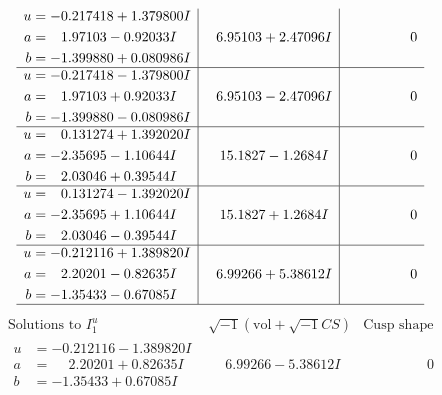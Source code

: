 \documentclass[1p]{elsarticle_modified}
\theoremstyle{definition}
\newcommand{\I}{\sqrt{-1}}
\begin{document}
$$\begin{array}{c|c|c}
\begin{aligned}
u &= -0.217418 + 1.379800 I \\
a &= \phantom{-}1.97103 - 0.92033 I \\
b &= -1.399880 + 0.080986 I\end{aligned}
 & \phantom{-}6.95103 + 2.47096 I & \phantom{-0.000000 } 0 \\ \hline\begin{aligned}
u &= -0.217418 - 1.379800 I \\
a &= \phantom{-}1.97103 + 0.92033 I \\
b &= -1.399880 - 0.080986 I\end{aligned}
 & \phantom{-}6.95103 - 2.47096 I & \phantom{-0.000000 } 0 \\ \hline\begin{aligned}
u &= \phantom{-}0.131274 + 1.392020 I \\
a &= -2.35695 - 1.10644 I \\
b &= \phantom{-}2.03046 + 0.39544 I\end{aligned}
 & \phantom{-}15.1827 - 1.2684 I & \phantom{-0.000000 } 0 \\ \hline\begin{aligned}
u &= \phantom{-}0.131274 - 1.392020 I \\
a &= -2.35695 + 1.10644 I \\
b &= \phantom{-}2.03046 - 0.39544 I\end{aligned}
 & \phantom{-}15.1827 + 1.2684 I & \phantom{-0.000000 } 0 \\ \hline\begin{aligned}
u &= -0.212116 + 1.389820 I \\
a &= \phantom{-}2.20201 - 0.82635 I \\
b &= -1.35433 - 0.67085 I\end{aligned}
 & \phantom{-}6.99266 + 5.38612 I & \phantom{-0.000000 } 0\\
 \hline 
 \end{array}$$\newpage$$\begin{array}{c|c|c}  
\text{Solutions to }I^u_{1}& \I (\text{vol} + \sqrt{-1}CS) & \text{Cusp shape}\\
 \hline 
\begin{aligned}
u &= -0.212116 - 1.389820 I \\
a &= \phantom{-}2.20201 + 0.82635 I \\
b &= -1.35433 + 0.67085 I\end{aligned}
 & \phantom{-}6.99266 - 5.38612 I & \phantom{-0.000000 } 0 \\ \hline\begin{aligned}

\end{aligned}
\end{array}$$
\end{document}
